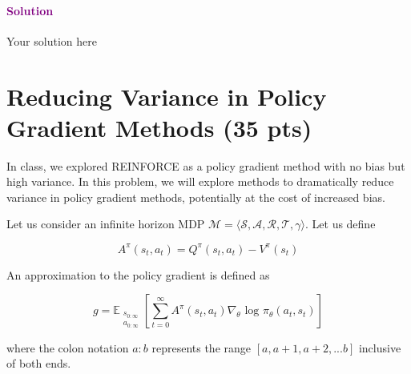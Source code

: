 \documentclass{article}
\newcommand\solution[1]{\paragraph{\textcolor{purple}{Solution}}{\color{purple} #1}}
\begin{document}
\solution{
	Your solution here
}

\newpage
\section{Reducing Variance in Policy Gradient Methods (35 pts)}

In class, we explored REINFORCE as a policy gradient method with no bias but high variance. In this problem, we will explore methods to dramatically reduce variance in policy gradient methods, potentially at the cost of increased bias. 

Let us consider an infinite horizon MDP $\mathcal{M} = \langle \mathcal{S}, \mathcal{A}, \mathcal{R}, \mathcal{T}, \gamma \rangle$. Let us define 

\begin{equation} 
A^{\pi}(s_t, a_t) = Q^{\pi}(s_t, a_t) - V^{\pi}(s_t)
\end{equation}

An approximation to the policy gradient is defined as

\begin{equation}
    g = \mathbb{E}_{\substack{s_{0:\infty}  \\ a_{0:\infty}}}[\sum_{t=0}^{\infty} A^{\pi}(s_t, a_t) \nabla_{\theta} \text{ log } \pi_{\theta}(a_t, s_t)]
\end{equation}

where the colon notation $a:b$ represents the range $[a, a+1, a+2, ... b]$ inclusive of both ends. 
\end{document}
